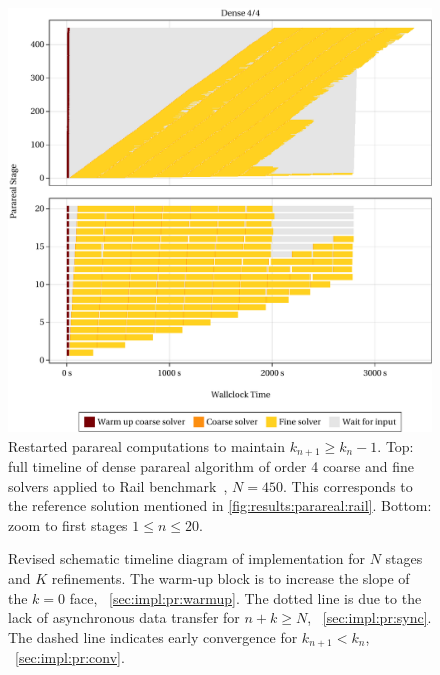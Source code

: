 \begin{figure}[tp]
  \centering
  \includegraphics[width=\textwidth]{figures/fig_timeline_ref.pdf}
  \caption[Restarted parareal computation]{
    Restarted parareal computations to maintain $k_{n+1} \geq k_n - 1$.
    Top: full timeline of dense parareal algorithm of order 4 coarse and fine solvers applied to Rail benchmark~\cite{morwiki_steel}, $N=450$.
    This corresponds to the reference solution mentioned in \autoref{fig:results:parareal:rail}.
    Bottom: zoom to first stages $1 \leq n \leq 20$.
  }
  \label{fig:impl:restart}
\end{figure}

\begin{figure}[t]
  \centering
  
  \caption[Revised schematic timeline diagram]{%
    Revised schematic timeline diagram of  implementation for $N$ stages and $K$ refinements.
    The warm-up block is to increase the slope of the $k=0$ face,
    \cf~\autoref{sec:impl:pr:warmup}.
    The dotted line is due to the lack of asynchronous data transfer for $n+k \geq N$,
    \cf~\autoref{sec:impl:pr:sync}.
    The dashed line indicates early convergence for $k_{n+1} < k_n$,
    \cf~\autoref{sec:impl:pr:conv}.
  }
  \label{fig:timeline:revised}
\end{figure}

